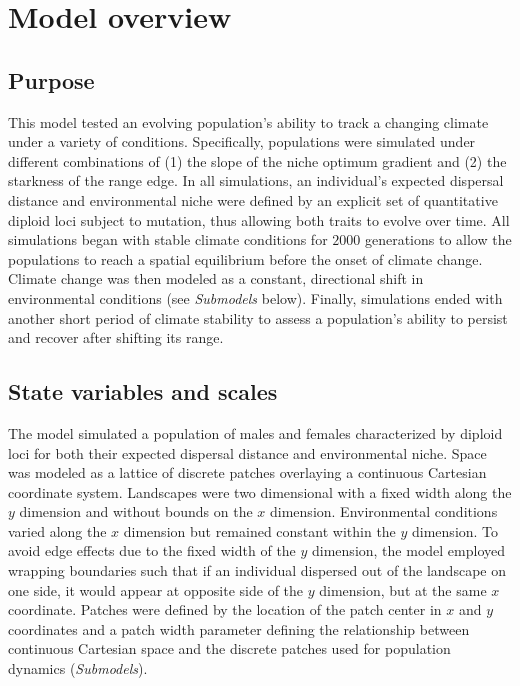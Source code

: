 \documentclass[11pt]{article}
\begin{document}


\renewcommand{\theequation}{A\arabic{equation}}
\renewcommand{\thetable}{A\arabic{table}}
\setcounter{equation}{0}  %
\setcounter{figure}{0}
\setcounter{table}{0}

\section*{Model overview}
\subsection*{Purpose} 
This model tested an evolving population's ability to track a changing climate under a variety of conditions. Specifically, populations were simulated under different combinations of (1) the slope of the niche optimum gradient and (2) the starkness of the range edge. In all simulations, an individual's expected dispersal distance and environmental niche were defined by an explicit set of quantitative diploid loci subject to mutation, thus allowing both traits to evolve over time. All simulations began with stable climate conditions for $2000$ generations to allow the populations to reach a spatial equilibrium before the onset of climate change. Climate change was then modeled as a constant, directional shift in environmental conditions (see \textit{Submodels} below). Finally, simulations ended with another short period of climate stability to assess a population's ability to persist and recover after shifting its range.

\subsection*{State variables and scales} 
The model simulated a population of males and females characterized by diploid loci for both their expected dispersal distance and environmental niche. Space was modeled as a lattice of discrete patches overlaying a continuous Cartesian coordinate system. Landscapes were two dimensional with a fixed width along the $y$ dimension and without bounds on the $x$ dimension. Environmental conditions varied along the $x$ dimension but remained constant within the $y$ dimension. To avoid edge effects due to the fixed width of the $y$ dimension, the model employed wrapping boundaries such that if an individual dispersed out of the landscape on one side, it would appear at opposite side of the $y$ dimension, but at the same $x$ coordinate. Patches were defined by the location of the patch center in $x$ and $y$ coordinates and a patch width parameter defining the relationship between continuous Cartesian space and the discrete patches used for population dynamics (\textit{Submodels}). 
\end{document}
